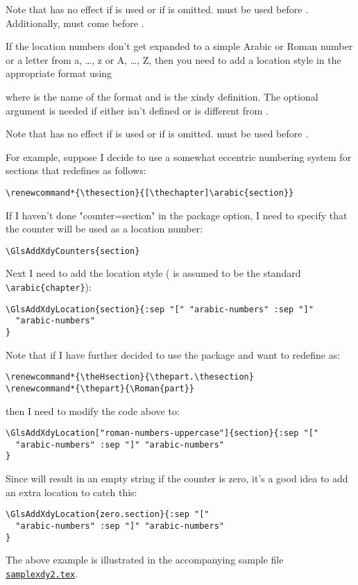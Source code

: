 \documentclass{nlctdoc}
\newcommand*{\samplefile}[1]{\hyperref[ex:sample#1]{\texttt{sample#1.tex}}}
\begin{document}
\begin{important}
Note that  has no effect if  is
used or if  is omitted.
 must be used before .
Additionally,  must come before
.
\end{important}

If the location numbers don't get expanded to a simple Arabic or 
Roman number or a letter from a, \ldots, z or A, \ldots, Z, then
you need to add a location style in the appropriate format using
\begin{definition}[\DescribeMacro{\GlsAddXdyLocation}]
\end{definition}
where  is the name of the format and  is
the \gls{xindy} definition. The optional argument 
is needed if  either isn't defined or is
different from .

\begin{important}
Note that  has no effect if  is
used or if  is omitted.
 must be used before .
\end{important}

For example, suppose I decide to use a somewhat eccentric numbering
system for sections that redefines  as follows:
\begin{verbatim}
\renewcommand*{\thesection}{[\thechapter]\arabic{section}}
\end{verbatim}
If I haven't done "counter=section" in the package
option, I need to specify that the counter will be used as a
location number:
\begin{verbatim}
\GlsAddXdyCounters{section}
\end{verbatim}
Next I need to add the location style ( is assumed to
be the standard \verb"\arabic{chapter}"):
\begin{verbatim}
\GlsAddXdyLocation{section}{:sep "[" "arabic-numbers" :sep "]"
  "arabic-numbers"
}
\end{verbatim}
Note that if I have further decided to use the 
package and want to redefine  as:
\begin{verbatim}
\renewcommand*{\theHsection}{\thepart.\thesection}
\renewcommand*{\thepart}{\Roman{part}}
\end{verbatim}
then I need to modify the  code above to:
\begin{verbatim}
\GlsAddXdyLocation["roman-numbers-uppercase"]{section}{:sep "[" 
  "arabic-numbers" :sep "]" "arabic-numbers"
}
\end{verbatim}
Since  will result in an empty string if the counter is
zero, it's a good idea to add an extra location to catch this:
\begin{verbatim}
\GlsAddXdyLocation{zero.section}{:sep "[" 
  "arabic-numbers" :sep "]" "arabic-numbers"
}
\end{verbatim}
The above example is illustrated in the accompanying sample file
\samplefile{xdy2}.
\end{document}
